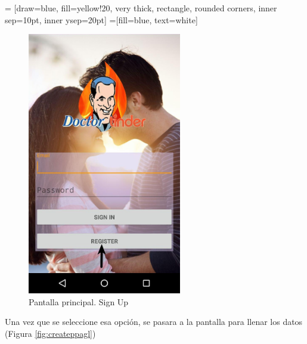 \documentclass[10pt,letterpaper,extrafontsizes]{memoir}
\begin{document}
\begin{center}
 = [draw=blue, fill=yellow!20, very thick,
    rectangle, rounded corners, inner sep=10pt, inner ysep=20pt]
 =[fill=blue, text=white]
\end{center}
%

\begin{figure}[H]
    \centering
\includegraphics[width=0.6\textwidth]{graficos/capturas/h}
    \caption{Pantalla principal. Sign Up}
    \label{fig:createppal}
\end{figure}

Una vez que se seleccione esa opción, se pasara a la pantalla para llenar los datos (Figura \ref{fig:createppagl}) 
\end{document}
